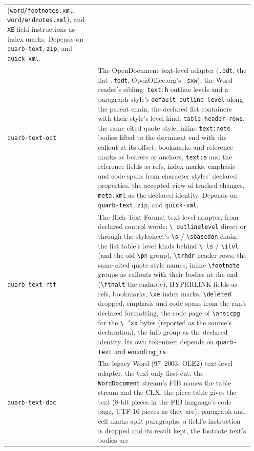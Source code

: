 \documentclass{report}
\begin{document}
\begin{xltabular}{\textwidth}{l X}
  (\texttt{word/footnotes.xml}, \texttt{word/endnotes.xml}), and
  \texttt{XE} field instructions as index marks. Depends on
  \texttt{quarb-text}, \texttt{zip}, and \texttt{quick-xml}. \\
\texttt{quarb-text-odt} & The OpenDocument text-level adapter
  (\texttt{.odt}, the flat \texttt{.fodt}, OpenOffice.org's
  \texttt{.sxw}), the Word reader's sibling: \texttt{text:h}
  outline levels and a paragraph style's
  \texttt{default-outline-level} along the parent chain, the
  declared list containers with their style's level kind,
  \texttt{table-header-rows}, the same cited quote style, inline
  \texttt{text:note} bodies lifted to the document end with the
  callout at its offset, bookmarks and reference marks as bearers
  or anchors, \texttt{text:a} and the reference fields as refs,
  index marks, emphasis and code spans from character styles'
  declared properties, the accepted view of tracked changes,
  \texttt{meta.xml} as the declared identity. Depends on
  \texttt{quarb-text}, \texttt{zip}, and \texttt{quick-xml}. \\
\texttt{quarb-text-rtf} & The Rich Text Format text-level
  adapter, from declared control words: \texttt{\textbackslash
  outlinelevel} direct or through the stylesheet's
  \texttt{\textbackslash s} / \texttt{\textbackslash sbasedon}
  chain, the list table's level kinds behind \texttt{\textbackslash
  ls} / \texttt{\textbackslash ilvl} (and the old
  \texttt{\textbackslash pn} group), \texttt{\textbackslash trhdr}
  header rows, the same cited quote-style names, inline
  \texttt{\textbackslash footnote} groups as callouts with their
  bodies at the end (\texttt{\textbackslash ftnalt} the endnote),
  HYPERLINK fields as refs, bookmarks, \texttt{\textbackslash xe}
  index marks, \texttt{\textbackslash deleted} dropped, emphasis
  and code spans from the run's declared formatting, the code page
  of \texttt{\textbackslash ansicpg} for the \texttt{\textbackslash
  'xx} bytes (reported as the source's declaration), the info
  group as the declared identity. Its own tokenizer; depends on
  \texttt{quarb-text} and \texttt{encoding\_rs}. \\
\texttt{quarb-text-doc} & The legacy Word (97--2003, OLE2)
  text-level adapter, the text-only first cut: the
  \texttt{WordDocument} stream's FIB names the table stream and
  the CLX, the piece table gives the text (8-bit pieces in the
  FIB language's code page, UTF-16 pieces as they are),
  paragraph and cell marks split paragraphs, a field's instruction
  is dropped and its result kept, the footnote text's bodies are

\end{xltabular}
\end{document}
